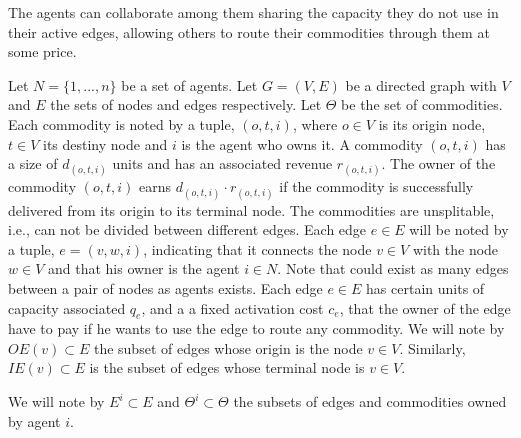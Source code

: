 \documentclass[review]{elsarticle}
\begin{document}
The agents can collaborate among them sharing the capacity they do not use in their active edges, allowing others to route their commodities through them at some price. 


Let $N=\{1,...,n\}$ be a set of agents. Let $G=(V,E)$ be a directed graph with
$V$ and $E$ the sets of nodes and edges respectively. 
Let $\Theta$ be the set of commodities. Each commodity is noted by a tuple,
$(o,t,i)$, where $o\in V$ is its origin node, $t\in V$ its destiny node and $i$
is the agent who owns it. A commodity $(o,t,i)$ has a size of $d_{(o,t,i)}$ units and has an associated revenue $r_{(o,t,i)}$. The owner of the commodity $(o,t,i)$ earns $d_(o,t,i)\cdot r_(o,t,i)$ if the commodity is successfully delivered from its origin to its terminal node. The commodities are unsplitable, i.e., can not be divided between different edges. Each edge $e \in E$ will be noted by a tuple, $e=(v,w,i)$, indicating that it connects the node $v\in V$
with the node $w \in V$ and that his owner is the agent $i\in N$. Note that
could exist as many edges between a pair of nodes as agents exists. Each edge $e
\in E$ has certain units of capacity associated $q_e$, and a a fixed activation
cost $c_e$, that the owner of the edge have to pay if he wants to use the edge to route any commodity. We will note by $OE(v)\subset E$ the subset of edges whose origin is the node $v\in V$. Similarly, $IE(v)\subset E$ is the subset of edges whose terminal node is $v\in V$.

We will note by $E^i \subset E$ and $\Theta^i\subset \Theta$ the subsets of
edges and commodities owned by agent $i$.
\end{document}
